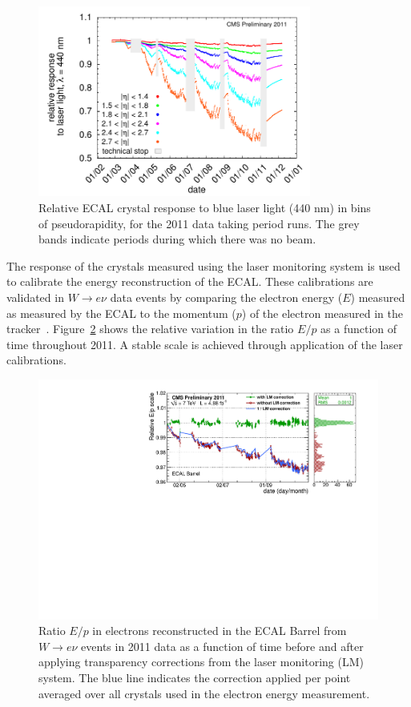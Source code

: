 \begin{figure}
	\centering
	\includegraphics[width=0.8\textwidth]{detector/ecal/laser.pdf}
	\caption{Relative ECAL crystal response to blue laser light (440 nm) in bins of pseudorapidity, 
	for the 2011 data taking period runs. The grey bands indicate periods during which there was no beam.}
	\label{fig:trans}
\end{figure}

The response of the crystals measured using the laser monitoring system is used to calibrate 
the energy reconstruction of the ECAL. These calibrations are validated in $W\rightarrow e\nu$ data events
by comparing the electron energy ($E$) measured as measured by the ECAL to the momentum 
($p$) of the electron measured in the tracker~\cite{CMS-DP-2012-007}. 
Figure~\ref{fig:scaleeop} shows the relative variation in the ratio $E/p$ as a function of time 
throughout 2011. A stable scale is achieved through application of the laser calibrations.

\begin{figure}
	\centering
	\includegraphics[width=\textwidth]{detector/ecal/scaleeop.pdf}
	\caption{Ratio $E/p$ in electrons reconstructed in the ECAL Barrel 
	from $W\rightarrow e\nu$ events in 2011 data as a function of time before 
	and after applying transparency corrections from the laser monitoring (LM) system. 
	The blue line indicates the correction applied per point averaged over all crystals used in the electron
	energy measurement.}
	\label{fig:scaleeop}
\end{figure}

